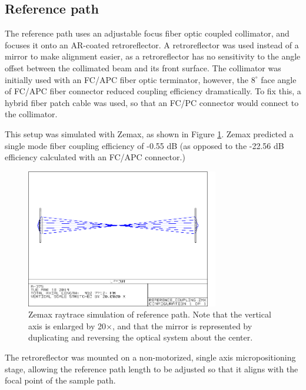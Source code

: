 \subsection{Reference path}
\label{sec:reference_path}


The reference path uses an adjustable focus fiber optic coupled collimator, and focuses it onto an AR-coated retroreflector. A retroreflector was used instead of a mirror to make alignment easier, as a retroreflector has no sensitivity to the angle offset between the collimated beam and its front surface. The collimator was initially used with an FC/APC fiber optic terminator, however, the $8^{\circ}$ face angle of FC/APC fiber connector reduced coupling efficiency dramatically. To fix this, a hybrid fiber patch cable was used, so that an FC/PC connector would connect to the collimator.

This setup was simulated with Zemax, as shown in Figure \ref{fig:reference_zemax}. Zemax predicted a single mode fiber coupling efficiency of -0.55 dB (as opposed to the -22.56 dB efficiency calculated with an FC/APC connector.)

\begin{figure}[h!]
\centering
\includegraphics[width=0.75\textwidth]{Images/Zemax/RP-raytrace.png}
\caption[Zemax raytrace simulation of reference path.]{Zemax raytrace simulation of reference path. Note that the vertical axis is enlarged by 20$\times$, and that the mirror is represented by duplicating and reversing the optical system about the center.\label{fig:reference_zemax}}
\end{figure}

The retroreflector was mounted on a non-motorized, single axis micropositioning stage, allowing the reference path length to be adjusted so that it aligns with the focal point of the sample path.

